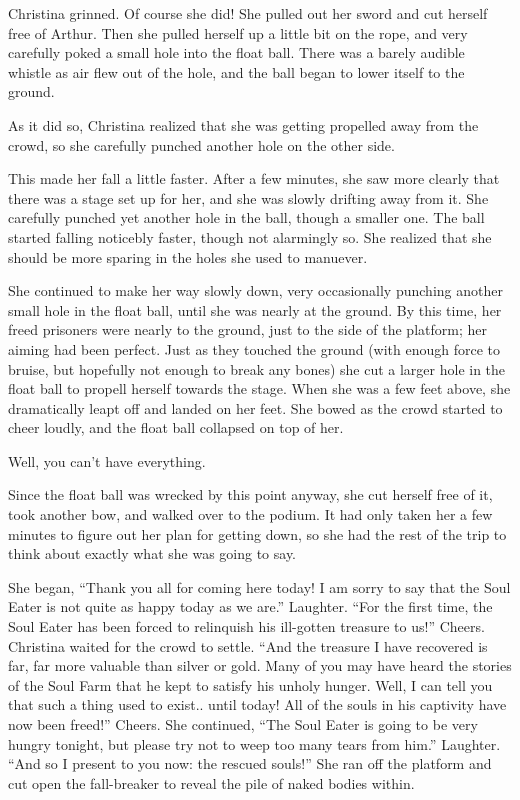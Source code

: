 \documentclass[showtrims,b6paper,draft,10pt]{memoir}
\begin{document}
Christina grinned.  Of course she did!  She pulled out her sword and cut herself free of Arthur.  Then she pulled herself up a little bit on the rope, and very carefully poked a small hole into the float ball.  There was a barely audible whistle as air flew out of the hole, and the ball began to lower itself to the ground.

As it did so, Christina realized that she was getting propelled away from the crowd, so she carefully punched another hole on the other side.

This made her fall a little faster.  After a few minutes, she saw more clearly that there was a stage set up for her, and she was slowly drifting away from it.  She carefully punched yet another hole in the ball, though a smaller one.  The ball started falling noticebly faster, though not alarmingly so.  She realized that she should be more sparing in the holes she used to manuever.

She continued to make her way slowly down, very occasionally punching another small hole in the float ball, until she was nearly at the ground.  By this time, her freed prisoners were nearly to the ground, just to the side of the platform; her aiming had been perfect.  Just as they touched the ground (with enough force to bruise, but hopefully not enough to break any bones) she cut a larger hole in the float ball to propell herself towards the stage.  When she was a few feet above, she dramatically leapt off and landed on her feet.  She bowed as the crowd started to cheer loudly, and the float ball collapsed on top of her.

Well, you can't have everything.

Since the float ball was wrecked by this point anyway, she cut herself free of it, took another bow, and walked over to the podium.  It had only taken her a few minutes to figure out her plan for getting down, so she had the rest of the trip to think about exactly what she was going to say.

She began, ``Thank you all for coming here today!  I am sorry to say that the Soul Eater is not quite as happy today as we are.''  Laughter.  ``For the first time, the Soul Eater has been forced to relinquish his ill-gotten treasure to us!''  Cheers.  Christina waited for the crowd to settle.  ``And the treasure I have recovered is far, far more valuable than silver or gold.  Many of you may have heard the stories of the Soul Farm that he kept to satisfy his unholy hunger.  Well, I can tell you that such a thing used to exist.. until today!  All of the souls in  his captivity have now been freed!''  Cheers.  She continued, ``The Soul Eater is going to be very hungry tonight, but please try not to weep too many tears from him.''  Laughter.  ``And so I present to you now:  the rescued souls!''  She ran off the platform and cut open the fall-breaker to reveal the pile of naked bodies within.
\end{document}
